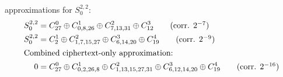 \documentclass[a4paper, 11pt]{article}
\newif\ifsubstates\substatesfalse
\begin{document}
 approximations for $S^{2,2}_{0}$:
\begin{align*}
  S^{2,2}_0 &= C^0_{27} \oplus C^1_{0, 8, 26} \oplus C^2_{7,13,31} \oplus C^3_{12} \tag{corr. $2^{-7}$} \\
  S^{2,2}_0 &= C^1_{2} \oplus C^2_{1,7,15,27} \oplus C^3_{6,14,20} \oplus
  C^4_{19} \tag{corr. $2^{-9}$} \\
\intertext{Combined ciphertext-only approximation:}
  0 &= C^0_{27} \oplus C^1_{0, 2, 26, 8} \oplus C^2_{1,13,15,27,31} \oplus
  C^3_{6,12,14,20} \oplus C^4_{19} \tag{corr. $2^{-16}$}
\end{align*}

\newcommand{\printstate}{
  \ifsubstates \pgfmathsetmacro{\roundsep}{1.25}
  \else        \pgfmathsetmacro{\roundsep}{0.80} \fi
  \pgfmathsetmacro{\opoffset}{.1}

  \ifsubstates
    \foreach \r in {-2,...,4} {
      \foreach \w in {0,...,4} {
        \draw[thick] (\w-.5,-\r*\roundsep) -- ++(0,-.25);
        \node[minimum width=1*1.0cm,minimum height=.25*1.5cm, inner sep=0pt] (W\r\w) at (\w,-\r*\roundsep-.125) {};
      }
      \draw[thick] (-.5,-\r*\roundsep) node[below left, inner sep=0pt, xshift=-3pt] {$S_{\r,*}^{\r}$} rectangle ++(5,-.25);
    }
    \node[minimum width=1*1.0cm,minimum height=.25*1.5cm, inner sep=0pt] (W-1-1) at (-1,--1*\roundsep-.125) {};
    \node[minimum width=1*1.0cm,minimum height=.25*1.5cm, inner sep=0pt] (W-2-1) at (-2,--1*\roundsep-.125) {};
  \else
    \foreach \r in {-1,...,4} {
      \foreach \w in {0,...,4} {
        \coordinate (W\r\w) at (\w,-\r*\roundsep-.125);
      }
    }
    \foreach \w in {0,...,4} {
      \coordinate (W-2\w) at (\w,--2.375*\roundsep-.125);
    }
    \coordinate (W-1-1) at (-1,--1*\roundsep-.125);
    \coordinate (W-2-1) at (-2,--1*\roundsep-.125);
  \fi

}
\end{document}
